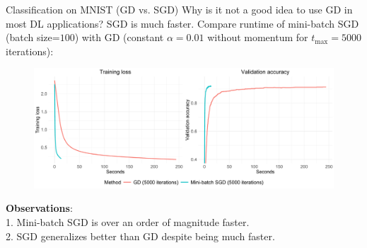 \documentclass[11pt,compress,t,notes=noshow, xcolor=table]{beamer}
\begin{document}
\begin{vbframe}{Classification on MNIST (GD vs. SGD)}
\vspace{-0.2cm}
Why is it not a good idea to use GD in most DL applications? SGD is much faster. Compare runtime of mini-batch SGD (batch size=$100$) with GD (constant $\alpha=0.01$ without momentum for $t_{\text{max}}=5000$ iterations):
\begin{figure}
            \includegraphics[width=1.0\textwidth]{figure_man/simu_mnist/SGD_GD_compar.pdf} \\
\end{figure} 
\textbf{Observations}:\\ 1. Mini-batch SGD is over an order of magnitude faster.\\
2. SGD generalizes better than GD despite being much faster. \\
\end{vbframe}



\endlecture
\end{document}
